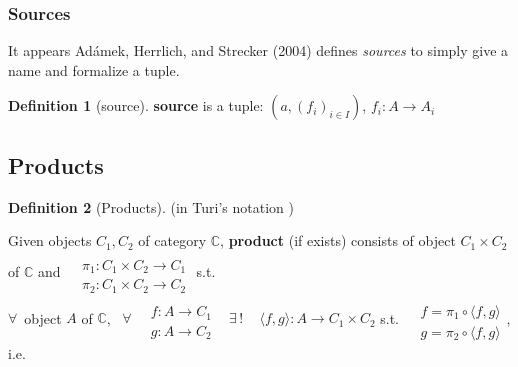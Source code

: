 \documentclass[twoside,landscape,10pt]{amsart}
\theoremstyle{plain}
\theoremstyle{definition}
\newtheorem{definition}{Definition}
\theoremstyle{remark}
\begin{document}
\begin{multicols*}{2}

\subsubsection{Sources}

It appears Ad\'{a}mek, Herrlich, and Strecker (2004) \cite{AHS2004} defines \emph{sources} to simply give a name and formalize a tuple.  

\begin{definition}[source]
  \textbf{source} is a tuple: $(a, (f_i)_{i\in I})$, $f_i:A\to A_i$
\end{definition}



\subsection{Products}

\begin{definition}[Products]

(in Turi's notation \cite{Turi2001})

Given objects $C_1,C_2$ of category $\mathbb{C}$, \textbf{product} (if exists) consists of object $C_1 \times C_2$ of $\mathbb{C}$ and $\begin{aligned} & \quad \\
  & \pi_1 : C_1 \times C_2 \to C_1 \\
  & \pi_2: C_1 \times C_2 \to C_2 \end{aligned}$ s.t. \\
$\forall \, $ object $A$ of $\mathbb{C}$, \, $\forall \, \begin{aligned} & \quad \\
  & f : A \to C_1 \\
  & g : A \to C_2 \end{aligned}$ \quad \, $\exists \, ! \quad \, \langle f,g \rangle : A \to C_1 \times C_2$ s.t. $\begin{aligned} & \quad \\
  & f = \pi_1 \circ \langle f,g \rangle \\
  & g = \pi_2 \circ \langle f,g \rangle \end{aligned}$, i.e. 



\end{definition}
\end{multicols*}
\end{document}
